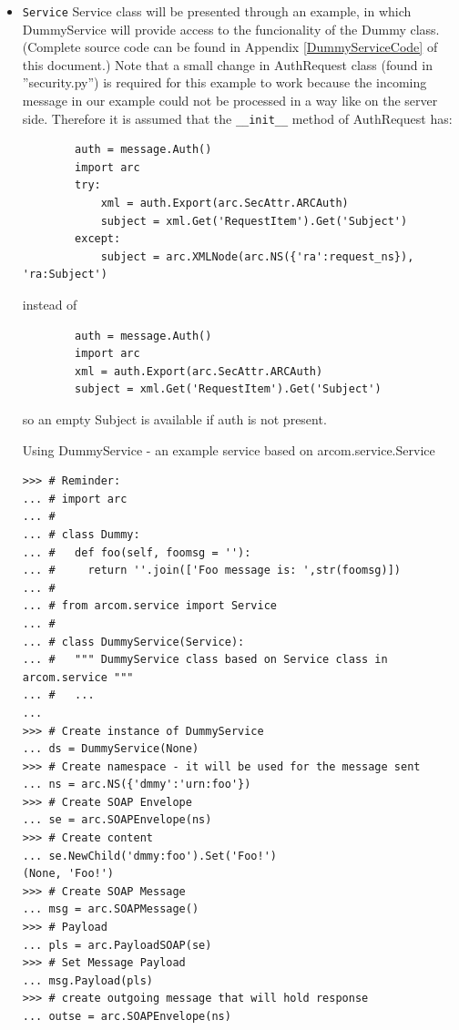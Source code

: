 \documentclass{article}
\begin{document}
\begin{flushleft}
\begin{itemize}
  \item{ \verb$Service$ \linebreak
  Service class will be presented through an example, in which DummyService will provide
  access to the funcionality of the Dummy class. (Complete source code can be found in Appendix 
  \ref{DummyServiceCode} of this document.)\linebreak
  Note that a small change in AuthRequest class (found in ''security.py'') is required for 
  this example to work because the incoming message in our example could not be processed
  in a way like on the server side.\label{ModAuthReq} Therefore it is assumed that the \verb$__init__$ method
  of AuthRequest has:
\begin{verbatim}
        auth = message.Auth()
        import arc
        try:
            xml = auth.Export(arc.SecAttr.ARCAuth)
            subject = xml.Get('RequestItem').Get('Subject')
        except:
            subject = arc.XMLNode(arc.NS({'ra':request_ns}), 'ra:Subject')
\end{verbatim}
  instead of \linebreak
\begin{verbatim}
        auth = message.Auth()
        import arc
        xml = auth.Export(arc.SecAttr.ARCAuth)
        subject = xml.Get('RequestItem').Get('Subject')
\end{verbatim}
  so an empty Subject is available if auth is not present.
    \begin{example}
      \caption{Using DummyService - an example service based on arcom.service.Service}\label{srvex}
\begin{verbatim}
>>> # Reminder:
... # import arc
... #
... # class Dummy:
... #   def foo(self, foomsg = ''):
... #     return ''.join(['Foo message is: ',str(foomsg)])
... # 
... # from arcom.service import Service
... # 
... # class DummyService(Service):
... #   """ DummyService class based on Service class in arcom.service """
... #   ...
... 
>>> # Create instance of DummyService
... ds = DummyService(None)
>>> # Create namespace - it will be used for the message sent
... ns = arc.NS({'dmmy':'urn:foo'})
>>> # Create SOAP Envelope
... se = arc.SOAPEnvelope(ns)
>>> # Create content
... se.NewChild('dmmy:foo').Set('Foo!')
(None, 'Foo!')
>>> # Create SOAP Message
... msg = arc.SOAPMessage()
>>> # Payload
... pls = arc.PayloadSOAP(se)
>>> # Set Message Payload
... msg.Payload(pls)
>>> # create outgoing message that will hold response
... outse = arc.SOAPEnvelope(ns)

\end{verbatim}
\end{example}}
\end{itemize}
\end{flushleft}
\end{document}
